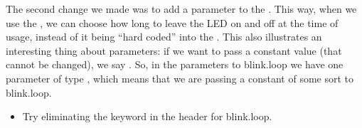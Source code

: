 The second change we made was to add a parameter to the \PROC. This way, when we use the \PROC, we can choose how long to leave the LED on and off at the time of usage, instead of it being ``hard coded'' into the . This also illustrates an interesting thing about \occam parameters: if we want to pass a constant value (that cannot be changed), we say \VAL. So, in the parameters to {\code blink.loop} we have one parameter of type \VAL \INT, which means that we are passing a constant of some sort to {\code blink.loop}.

\makingthingsbreak
\begin{itemize}
	\item Try eliminating the keyword \VAL in the \PROC header for {\code blink.loop}.
\end{itemize}

\seealso

\XXX